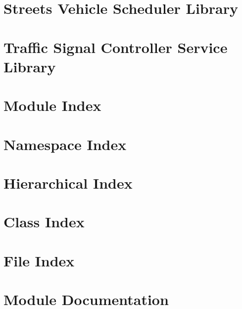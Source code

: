 \documentclass[twoside]{book}
\newcommand{\+}{\discretionary{\mbox{\scriptsize$\hookleftarrow$}}{}{}}
\begin{document}
\chapter{Streets Vehicle Scheduler Library}
\label{md_streets_utils_streets_vehicle_scheduler_README}

\chapter{Traffic Signal Controller Service Library}
\label{md_tsc_client_service_README}

\chapter{Module Index}

\chapter{Namespace Index}

\chapter{Hierarchical Index}

\chapter{Class Index}

\chapter{File Index}

\chapter{Module Documentation}

\end{document}
